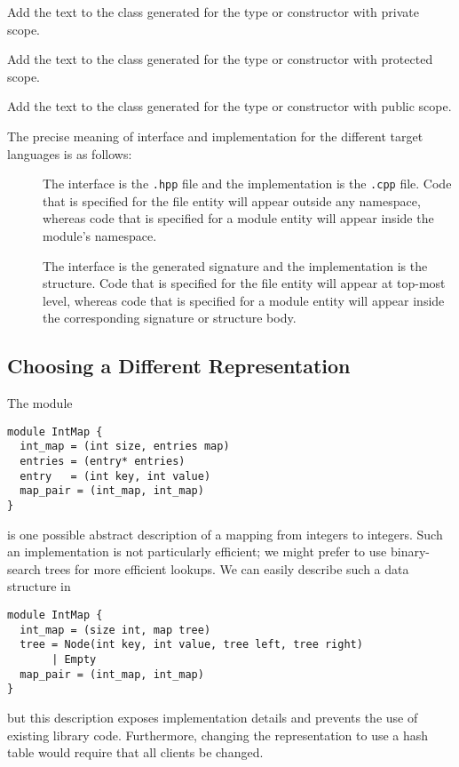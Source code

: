 \begin{description}
    Add the text to the class generated for the type or constructor with private scope.

    Add the text to the class generated for the type or constructor with protected scope.

     Add the text to the class generated for the type or constructor with public scope.

\end{description}%

The precise meaning of interface and implementation for the different
target languages is as follows:
\begin{description}
  \item[\Cplusplus{}]
    The interface is the \texttt{.hpp} file and the implementation is the \texttt{.cpp}
    file.
    Code that is specified for the file entity will appear outside any namespace, whereas
    code that is specified for a module entity will appear inside the module's namespace.
  \item[\sml{}]
    The interface is the generated signature and the implementation is the structure.
    Code that is specified for the file entity will appear at top-most level, whereas code
    that is specified for a module entity will appear inside the corresponding signature
    or structure body.
\end{description}%

\subsection{Choosing a Different Representation}

The \asdl{} module
\begin{code}\begin{lstlisting}[language=ASDL]
module IntMap {
  int_map = (int size, entries map)
  entries = (entry* entries)
  entry   = (int key, int value)
  map_pair = (int_map, int_map)
}
\end{lstlisting}\end{code}%
is one possible abstract description of a mapping from integers to
integers.
Such an implementation is not particularly efficient; we might prefer to
use binary-search trees for more efficient lookups.
We can easily describe such a data structure in \asdl{}
\begin{code}\begin{lstlisting}[language=ASDL]
module IntMap {
  int_map = (size int, map tree)
  tree = Node(int key, int value, tree left, tree right)
       | Empty
  map_pair = (int_map, int_map)
}
\end{lstlisting}\end{code}%
but this description exposes implementation details and prevents the use
of existing library code.  Furthermore, changing the representation
to use a hash table would require that all clients be changed.

